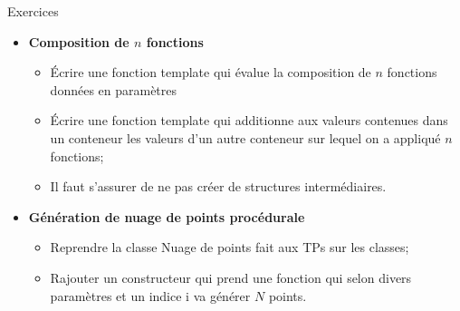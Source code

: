 \documentclass[handout,10pt]{beamer}
\begin{document}
\begin{frame}[fragile]{Exercices}
\begin{itemize}
\item \textbf{Composition de $n$ fonctions}
\begin{itemize}
\item \'Ecrire une fonction template qui évalue la composition de $n$ fonctions données en paramètres
\item \'Ecrire une fonction template qui additionne aux valeurs contenues dans un conteneur les valeurs d'un
autre conteneur sur lequel on a appliqué $n$ fonctions;
\item Il faut s'assurer de ne pas créer de structures intermédiaires.
\end{itemize}
\item \textbf{Génération de nuage de points procédurale}
\begin{itemize}
\item Reprendre la classe Nuage de points fait aux TPs sur les classes;
\item Rajouter un constructeur qui prend une fonction qui selon divers paramètres et un indice i va générer $N$ points.
\end{itemize}
\end{itemize}
\end{frame}
\end{document}
